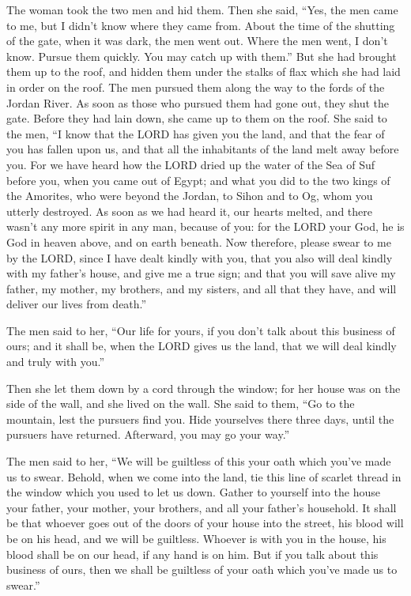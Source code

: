 \myverse{}The woman took the two men and hid them. Then she said, “Yes, the
men came to me, but I didn’t know where they came from.
\myverse{}About the time of the shutting of the gate, when it was dark, the men went out.
Where the men went, I don’t know. Pursue them quickly. You may catch up with them.”
\myverse{}But she had brought them up to the roof, and hidden them under the stalks of
flax which she had laid in order on the roof.
\myverse{}The men pursued them along the way to the fords of the Jordan River. As soon
as those who pursued them had gone out, they shut the gate.
\myverse{}Before they had lain down, she came up to them on the roof.
\myverse{}She said to the men, “I know that the LORD has given you the land, and that
the fear of you has fallen upon us, and that all the inhabitants of the land melt away before you.
\myverse{}For we have heard how the LORD dried up the water of the Sea of Suf before
you, when you came out of Egypt; and what you did to the two kings of the Amorites, who were beyond the
Jordan, to Sihon and to Og, whom you utterly destroyed.
\myverse{}As soon as we had heard it, our hearts melted, and there wasn’t any more spirit
in any man, because of you: for the LORD your God, he is God in heaven above, and on earth beneath.
\myverse{}Now therefore, please swear to me by the LORD, since I have dealt kindly with
you, that you also will deal kindly with my father’s house, and give me a true sign;
\myverse{}and that you will save alive my father, my mother, my brothers, and my sisters,
and all that they have, and will deliver our lives from death.”

\myverse{}The men said to her, “Our life for yours, if you don’t talk about
this business of ours; and it shall be, when the LORD gives us the land, that we will deal kindly and
truly with you.”

\myverse{}Then she let them down by a cord through the window; for her
house was on the side of the wall, and she lived on the wall.
\myverse{}She said to them, “Go to the mountain, lest the pursuers find you. Hide yourselves
there three days, until the pursuers have returned. Afterward, you may go your way.”

\myverse{}The men said to her, “We will be guiltless of this your oath
which you’ve made us to swear.
\myverse{}Behold, when we come into the land, tie this line of scarlet thread in the
window which you used to let us down. Gather to yourself into the house your father, your mother, your
brothers, and all your father’s household.
\myverse{}It shall be that whoever goes out of the doors of your house into the street,
his blood will be on his head, and we will be guiltless. Whoever is with you in the house, his blood shall
be on our head, if any hand is on him.
\myverse{}But if you talk about this business of ours, then we shall be guiltless of
your oath which you’ve made us to swear.”

